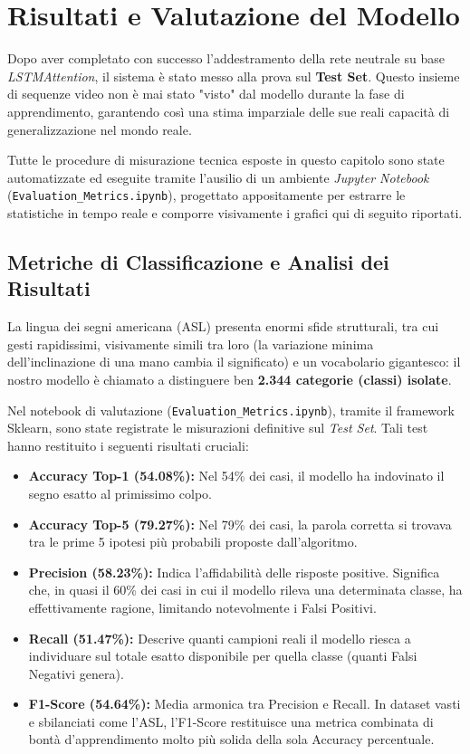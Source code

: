 
\section{Risultati e Valutazione del Modello}

Dopo aver completato con successo l'addestramento della rete neutrale su base \textit{LSTMAttention}, il sistema è stato messo alla prova sul \textbf{Test Set}. Questo insieme di sequenze video non è mai stato "visto" dal modello durante la fase di apprendimento, garantendo così una stima imparziale delle sue reali capacità di generalizzazione nel mondo reale.

Tutte le procedure di misurazione tecnica esposte in questo capitolo sono state automatizzate ed eseguite tramite l'ausilio di un ambiente \textit{Jupyter Notebook} (\texttt{Evaluation\_Metrics.ipynb}), progettato appositamente per estrarre le statistiche in tempo reale e comporre visivamente i grafici qui di seguito riportati.


\subsection{Metriche di Classificazione e Analisi dei Risultati}
La lingua dei segni americana (ASL) presenta enormi sfide strutturali, tra cui gesti rapidissimi, visivamente simili tra loro (la variazione minima dell'inclinazione di una mano cambia il significato) e un vocabolario gigantesco: il nostro modello è chiamato a distinguere ben \textbf{2.344 categorie (classi) isolate}.

Nel notebook di valutazione (\texttt{Evaluation\_Metrics.ipynb}), tramite il framework Sklearn, sono state registrate le misurazioni definitive sul \textit{Test Set}. Tali test hanno restituito i seguenti risultati cruciali:

\begin{itemize}
    \item \textbf{Accuracy Top-1 (54.08\%):} Nel 54\% dei casi, il modello ha indovinato il segno esatto al primissimo colpo.
    \item \textbf{Accuracy Top-5 (79.27\%):} Nel 79\% dei casi, la parola corretta si trovava tra le prime 5 ipotesi più probabili proposte dall'algoritmo.
    \item \textbf{Precision (58.23\%):} Indica l'affidabilità delle risposte positive. Significa che, in quasi il 60\% dei casi in cui il modello rileva una determinata classe, ha effettivamente ragione, limitando notevolmente i Falsi Positivi.
    \item \textbf{Recall (51.47\%):} Descrive quanti campioni reali il modello riesca a individuare sul totale esatto disponibile per quella classe (quanti Falsi Negativi genera).
    \item \textbf{F1-Score (54.64\%):} Media armonica tra Precision e Recall. In dataset vasti e sbilanciati come l'ASL, l'F1-Score restituisce una metrica combinata di bontà d'apprendimento molto più solida della sola Accuracy percentuale.
\end{itemize}


